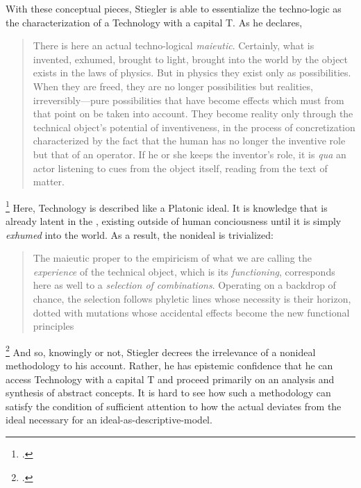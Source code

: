 \documentclass[letterpaper,notitlepage,12pt]{article}
\begin{document}
With these conceptual pieces, Stiegler is able to essentialize the techno-logic
as the characterization of a Technology with a capital T.
As he declares, \blockquote{There is here an actual techno-logical
  \textit{maieutic}. Certainly, what is invented, exhumed, brought to light, 
  brought into the world by the object exists in the laws of physics. But in
  physics they exist only as possibilities. When they are freed, they are no 
  longer possibilities but realities, irreversibly---pure possibilities that 
  have become effects which must from that point on be taken into account. They 
  become reality only through the technical object's potential of inventiveness, 
  in the process of concretization characterized by the fact that the human has 
  no longer the inventive role but that of an operator. If he or she keeps the 
  inventor's role, it is \textit{qua} an actor listening to cues from the object 
itself, reading from the text of matter.}\footcite[p.
75]{stiegler_technics_1998}
Here, Technology is described like a Platonic ideal.
It is knowledge that is already latent in the , existing
outside of human conciousness until it is simply \textit{exhumed} into the
world.
As a result, the nonideal is trivialized: \blockquote{The maieutic proper to the 
  empiricism of what we are calling the \textit{experience} of the technical 
  object, which is its \textit{functioning}, corresponds here as well to a 
  \textit{selection of combinations}. Operating on a backdrop of chance,
the selection follows phyletic lines whose necessity is their horizon, dotted 
with mutations whose accidental effects become the new functional
principles}\footcite[p.76]{stiegler_technics_1998}
And so, knowingly or not, Stiegler decrees the irrelevance of a nonideal
methodology to his account.
Rather, he has epistemic confidence that he can access Technology with a capital
T and proceed primarily on an analysis and synthesis of abstract concepts.
It is hard to see how such a methodology can satisfy the condition of sufficient
attention to how the actual deviates from the ideal necessary for an
ideal-as-descriptive-model.
\end{document}
